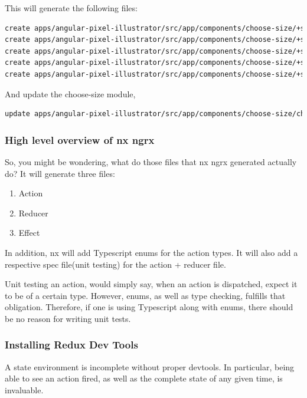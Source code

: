 This will generate the following files:
\begin{lstlisting}[language=Bash]
create apps/angular-pixel-illustrator/src/app/components/choose-size/+state/choose-size.actions.ts (684 bytes)
create apps/angular-pixel-illustrator/src/app/components/choose-size/+state/choose-size.reducer.ts (869 bytes)
create apps/angular-pixel-illustrator/src/app/components/choose-size/+state/choose-size.effects.ts (859 bytes)
create apps/angular-pixel-illustrator/src/app/components/choose-size/+state/choose-size.effects.spec.ts (1070 bytes)
create apps/angular-pixel-illustrator/src/app/components/choose-size/+state/choose-size.reducer.spec.ts (364 bytes)
\end{lstlisting}
And update the choose-size module,
\begin{lstlisting}[language=Bash]
update apps/angular-pixel-illustrator/src/app/components/choose-size/choose-size.module.ts
\end{lstlisting}

\subsubsection{ High level overview of nx ngrx }
So, you might be wondering, what do those files that nx ngrx generated actually
do? It will generate three files:
\begin{enumerate}
  \item Action
  \item Reducer
  \item Effect
\end{enumerate}

In addition, nx will add Typescript enums for the action types. It will also
add a respective spec file(unit testing) for the action + reducer file.

\colorbox{darkgray}{\color{white}{Unit testing Actions?}}

Unit testing an action, would simply say, when an action is dispatched, expect
it to be of a certain type. However, enums, as well as type checking, fulfills
that obligation. Therefore, if one is using Typescript along with enums, there
should be no reason for writing unit tests.

\subsubsection{ Installing Redux Dev Tools }
A state environment is incomplete without proper devtools. In particular, being
able to see an action fired, as well as the complete state of any given time,
is invaluable.


